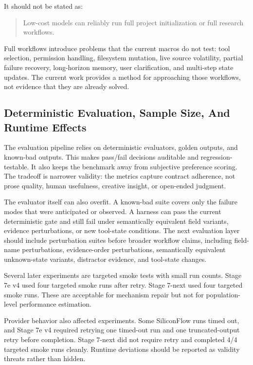 \documentclass[11pt]{article}
\begin{document}
It should not be stated as:

\begin{quote}
Low-cost models can reliably run full project initialization or full research workflows.
\end{quote}

Full workflows introduce problems that the current macros do not test: tool selection, permission handling, filesystem mutation, live source volatility, partial failure recovery, long-horizon memory, user clarification, and multi-step state updates. The current work provides a method for approaching those workflows, not evidence that they are already solved.

\subsection{Deterministic Evaluation, Sample Size, And Runtime Effects}

The evaluation pipeline relies on deterministic evaluators, golden outputs, and known-bad outputs. This makes pass/fail decisions auditable and regression-testable. It also keeps the benchmark away from subjective preference scoring. The tradeoff is narrower validity: the metrics capture contract adherence, not prose quality, human usefulness, creative insight, or open-ended judgment.

The evaluator itself can also overfit. A known-bad suite covers only the failure modes that were anticipated or observed. A harness can pass the current deterministic gate and still fail under semantically equivalent field variants, evidence perturbations, or new tool-state conditions. The next evaluation layer should include perturbation suites before broader workflow claims, including field-name perturbations, evidence-order perturbations, semantically equivalent unknown-state variants, distractor evidence, and tool-state changes.

Several later experiments are targeted smoke tests with small run counts. Stage 7e v4 used four targeted smoke runs after retry. Stage 7-next used four targeted smoke runs. These are acceptable for mechanism repair but not for population-level performance estimation.

Provider behavior also affected experiments. Some SiliconFlow runs timed out, and Stage 7e v4 required retrying one timed-out run and one truncated-output retry before completion. Stage 7-next did not require retry and completed 4/4 targeted smoke runs cleanly. Runtime deviations should be reported as validity threats rather than hidden.
\end{document}
